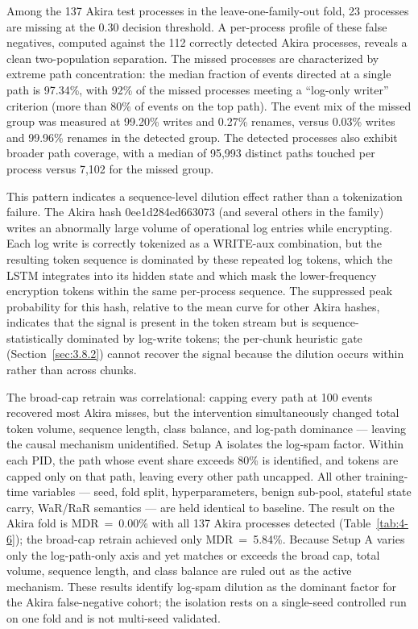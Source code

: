 Among the 137 Akira test processes in the leave-one-family-out fold, 23 processes are missing at the 0.30 decision threshold. A per-process profile of these false negatives, computed against the 112 correctly detected Akira processes, reveals a clean two-population separation. The missed processes are characterized by extreme path concentration: the median fraction of events directed at a single path is 97.34\%, with 92\% of the missed processes meeting a ``log-only writer'' criterion (more than 80\% of events on the top path). The event mix of the missed group was measured at 99.20\% writes and 0.27\% renames, versus 0.03\% writes and 99.96\% renames in the detected group. The detected processes also exhibit broader path coverage, with a median of 95,993 distinct paths touched per process versus 7,102 for the missed group.

This pattern indicates a sequence-level dilution effect rather than a tokenization failure. The Akira hash 0ee1d284ed663073 (and several others in the family) writes an abnormally large volume of operational log entries while encrypting. Each log write is correctly tokenized as a WRITE-aux combination, but the resulting token sequence is dominated by these repeated log tokens, which the \textmu{}LSTM integrates into its hidden state and which mask the lower-frequency encryption tokens within the same per-process sequence. The suppressed peak probability for this hash, relative to the mean curve for other Akira hashes, indicates that the signal is present in the token stream but is sequence-statistically dominated by log-write tokens; the per-chunk heuristic gate (Section~\ref{sec:3.8.2}) cannot recover the signal because the dilution occurs within rather than across chunks.

The broad-cap retrain was correlational: capping every path at 100 events recovered most Akira misses, but the intervention simultaneously changed total token volume, sequence length, class balance, and log-path dominance --- leaving the causal mechanism unidentified. Setup A isolates the log-spam factor. Within each PID, the path whose event share exceeds 80\% is identified, and tokens are capped only on that path, leaving every other path uncapped. All other training-time variables --- seed, fold split, hyperparameters, benign sub-pool, stateful state carry, WaR/\allowbreak{}RaR semantics --- are held identical to baseline. The result on the Akira fold is MDR~=~0.00\% with all 137 Akira processes detected (Table~\ref{tab:4-6}); the broad-cap retrain achieved only MDR~=~5.84\%. Because Setup A varies only the log-path-only axis and yet matches or exceeds the broad cap, total volume, sequence length, and class balance are ruled out as the active mechanism. These results identify log-spam dilution as the dominant factor for the Akira false-negative cohort; the isolation rests on a single-seed controlled run on one fold and is not multi-seed validated.

